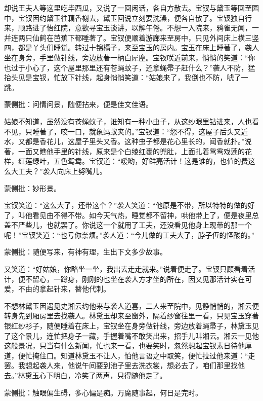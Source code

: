 \begin{parag}


    却说王夫人等这里吃毕西瓜，又说了一回闲话，各自方散去。宝钗与黛玉等回至园中，宝钗因约黛玉往藕香榭去，黛玉回说立刻要洗澡，便各自散了。宝钗独自行来，顺路进了怡红院，意欲寻宝玉谈讲，以解午倦。不想一入院来，鸦雀无闻，一幷连两只仙鹤在芭蕉下都睡著了。宝钗便顺着游廊来至房中，只见外间床上横三竖四，都是丫头们睡觉。转过十锦槅子，来至宝玉的房内。宝玉在床上睡著了，袭人坐在身旁，手里做针线，旁边放著一柄白犀麈。宝钗咲近前来，悄悄的笑道：“你也过于小心了，这个屋里那里还有苍蝇蚊子，还拿蝇帚子赶什么？”袭人不防，猛抬头见是宝钗，忙放下针线，起身悄悄笑道：“姑娘来了，我倒也不防，唬了一跳。\begin{note}蒙侧批：问情问景，随便拈来，便是佳文佳语。\end{note}姑娘不知道，虽然没有苍蝇蚊子，谁知有一种小虫子，从这纱眼里钻进来，人也看不见，只睡著了，咬一口，就象蚂蚁夹的。”宝钗道：“怨不得，这屋子后头又近水，又都是香花儿，这屋子里头又香。这种虫子都是花心里长的，闻香就扑。”说著，一面又瞧他手里的针线，原来是个白绫红裹的兜肚，上面扎着鸳鸯戏莲的花样，红莲绿叶，五色鸳鸯。宝钗道：“嗳哟，好鲜亮活计！这是谁的，也值的费这么大工夫？”袭人向床上努嘴儿。\begin{note}蒙侧批：妙形景。\end{note}宝钗笑道：“这么大了，还带这个？”袭人笑道：“他原是不带，所以特特的做的好了，叫他看见由不得不带。如今天气热，睡觉都不留神，哄他带上了，便是夜里总盖不严些儿，也就罢了。你说这一个就用了工夫，还没看见他身上现带的那一个呢！”宝钗笑道：“也亏你奈烦。”袭人道：“今儿做的工夫大了，脖子仾的怪酸的。”\begin{note}蒙侧批：随便写来，有神有理，生出下文多少故事。\end{note}又笑道：“好姑娘，你略坐一坐，我出去走走就来。”说着便走了。宝钗只顾看着活计，便不留心，一蹲身，刚刚的也坐在袭人方才坐的所在，因又见那活计实在可爱，不由的拿起针来，替他代刺。
\end{parag}


\begin{parag}


    不想林黛玉因遇见史湘云约他来与袭人道喜，二人来至院中，见静悄悄的，湘云便转身先到厢房里去找袭人。林黛玉却来至窗外，隔着纱窗往里一看，只见宝玉穿著银红纱衫子，随便睡着在床上，宝钗坐在身旁做针线，旁边放着蝇帚子，林黛玉见了这个景儿，连忙把身子一藏，手握着嘴不敢笑出来，招手儿叫湘云。湘云一见他这般景况，只当有什么新闻，忙也来一看，也要笑时，忽然想起宝钗素日待他厚道，便忙掩住口。知道林黛玉不让人，怕他言语之中取笑，便忙拉过他来道：“走罢。我想起袭人来，他说午间要到池子里去洗衣裳，想必去了，咱们那里找他去。”林黛玉心下明白，冷笑了两声，只得随他走了。\begin{note}蒙侧批：触眼偏生碍，多心偏是痴。万魔随事起，何日是完时。\end{note}
\end{parag}



